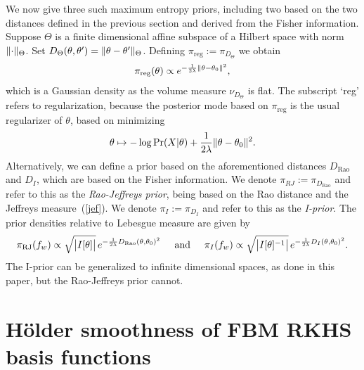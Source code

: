 \documentclass[preprint,12pt,authoryear]{elsarticle}
\def\lambdaexp{\frac{1}{2\lambda}} %
\DeclarePairedDelimiter{\abs}{\lvert}{\rvert}
\DeclarePairedDelimiter{\norm}{\lVert}{\rVert}
\def\Pr{\mathop{\rm Pr}\nolimits}
\begin{document}
We now give three such maximum entropy priors, including two based on the two distances defined in the previous section and derived from the Fisher information.
Suppose $\Theta$ is a finite dimensional affine subspace of a Hilbert space with norm $\norm{\cdot}_\Theta$. Set $D_\Theta(\theta,\theta')=\norm{\theta-\theta'}_\Theta$.
Defining $\pi_\text{reg}:=\pi_{D_\Theta}$ we obtain
\begin{align*}
\pi_\text{reg}(\theta) \propto e^{-\lambdaexp \norm{\theta-\theta_0}^2},
\end{align*}
which is a Gaussian density as the volume measure $\nu_{D_\Theta}$ is flat.
The subscript `reg' refers to regularization, because the posterior mode based on $\pi_\text{reg}$ is the usual regularizer of $\theta$, based on minimizing
\[  \theta \mapsto -\log\Pr(X|\theta) + \lambdaexp \norm{\theta-\theta_0}^2. \]
Alternatively, we can define a prior based on the aforementioned distances $D_\text{Rao}$ and $D_I$, which are based on the Fisher information.
We denote $\pi_{RJ}:=\pi_{D_\text{Rao}}$ and refer to this as the {\em Rao-Jeffreys prior}, being based on the Rao distance and the Jeffreys measure~(\ref{jef}).
We denote $\pi_I:=\pi_{D_I}$ and refer to this as the {\em I-prior}.
The prior densities relative to Lebesgue measure are given by
\begin{align*}
\pi_\text{RJ}(f_w) \propto \sqrt{\abs[\big]{I[\theta]}}\,e^{-\lambdaexp D_\text{Rao}(\theta,\theta_0)^2} 
\hspace{5mm}\text{and}\hspace{5mm}
\pi_I(f_w) \propto \sqrt{\abs[\big]{I[\theta]^{-1}}}\,e^{-\lambdaexp D_I(\theta,\theta_0)^2}.
\end{align*}
The I-prior can be generalized to infinite dimensional spaces, as done in this paper, but the Rao-Jeffreys prior cannot.

















\section{H\"older smoothness of FBM RKHS basis functions}\label{app-hold}
\end{document}
